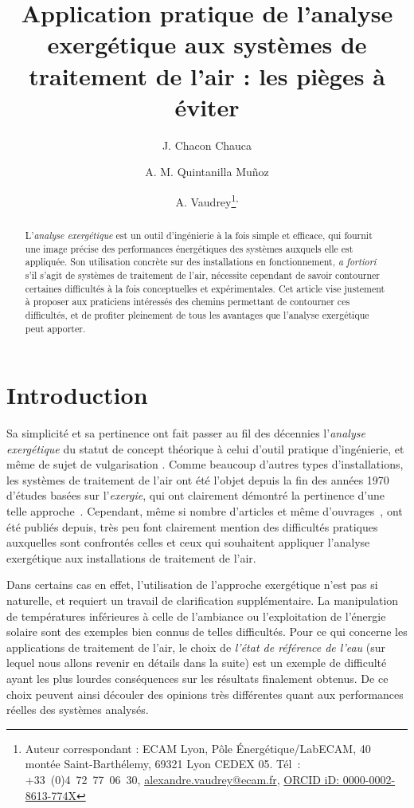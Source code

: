 \documentclass[a4paper,11pt]{scrartcl}
\title{Application pratique de l'analyse exergétique aux systèmes de traitement
de l'air : les pièges à éviter}
\author[1,2]{J. Chacon Chauca}
\author[3]{A. M. Quintanilla Muñoz}
\author[1,2]{A. Vaudrey\thanks{Auteur correspondant : ECAM Lyon, Pôle Énergétique/LabECAM, 40 montée Saint-Barthélemy, 69321 Lyon CEDEX 05. Tél : +33 (0)4 72 77 06 30, \href{mailto:alexandre.vaudrey@ecam.fr}{alexandre.vaudrey@ecam.fr}, \href{http://orcid.org/0000-0002-8613-774X}{ORCID iD: 0000-0002-8613-774X}}\textsuperscript{,}}
\affil[1]{Université de Lyon, ECAM Lyon, INSA-Lyon, LabECAM, F-69005, France.}
\affil[2]{Pontificia Universidad Cat\'olica del Per\'u (PUCP), Laboratorio
de Energ\'ia, Lima, Pérou.}
\affil[3]{Département Énergie, Institut FEMTO-ST, UMR 6174, CNRS, Université de Bourgogne Franche-Comté, Belfort, France.}
\begin{document}
\maketitle

\begin{abstract}
	L'\emph{analyse exergétique} est un outil d'ingénierie à la fois simple
	et efficace, qui fournit une image précise des performances énergétiques
	des systèmes auxquels elle est appliquée. Son utilisation concrète sur
	des installations en fonctionnement, \textsl{a fortiori} s'il s'agit de
	systèmes de traitement de l'air, nécessite cependant de savoir
	contourner certaines difficultés à la fois conceptuelles et
	expérimentales. Cet article vise justement à proposer aux praticiens
	intéressés des chemins permettant de contourner ces difficultés, et de
	profiter pleinement de tous les avantages que l'analyse exergétique peut
	apporter.
\end{abstract}

\tableofcontents

\section{Introduction}

Sa simplicité et sa pertinence ont fait passer au fil des décennies
l'\emph{analyse exergétique} du statut de concept théorique à celui d'outil
pratique d'ingénierie, et même de sujet de vulgarisation \cite{SV-2013}. Comme
beaucoup d'autres types d'installations, les systèmes de traitement de l'air ont
été l'objet depuis la fin des années 1970 d'études basées sur l'\emph{exergie},
qui ont clairement démontré la pertinence d'une telle
approche~\cite{Gaggioli-1978,ASHRAE-1979,ECM-021-0065}. Cependant, même si nombre d'articles et même d'ouvrages~\cite{Dincer-2015}, ont été publiés depuis, très peu font clairement mention des difficultés pratiques auxquelles sont confrontés
celles et ceux qui souhaitent appliquer l'analyse exergétique aux installations
de traitement de l'air.

Dans certains cas en effet, l'utilisation de l'approche exergétique n’est pas si
naturelle, et requiert un travail de clarification supplémentaire. La
manipulation de températures inférieures à celle de l’ambiance
\cite{RGT-035-0651} ou l’exploitation de l’énergie solaire \cite{EPL-104-40008}
sont des exemples bien connus de telles difficultés. Pour ce qui concerne les
applications de traitement de l’air, le choix de \emph{l’état de référence de
l’eau} (sur lequel nous allons revenir en détails dans la suite) est un exemple
de difficulté ayant les plus lourdes conséquences sur les résultats finalement
obtenus. De ce choix peuvent ainsi découler des opinions très différentes quant
aux performances réelles des systèmes analysés. 
\end{document}
